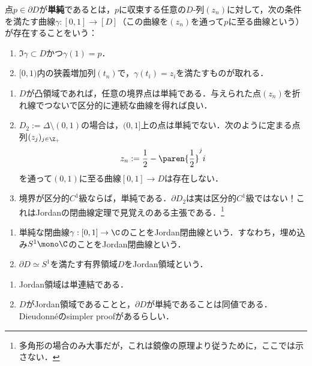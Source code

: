 \documentclass[uplatex, dvipdfmx]{jsreport}
\begin{document}
\begin{definition}
    点$p\in\partial D$が\textbf{単純}であるとは，$p$に収束する任意の$D$-列$(z_n)$に対して，次の条件を満たす曲線$\gamma:[0,1]\to[D]$（この曲線を$(z_n)$を通って$p$に至る曲線という）が存在することをいう：
    \begin{enumerate}
        \item $\Im\gamma\subset D$かつ$\gamma(1)=p$．
        \item $[0,1)$内の狭義増加列$(t_n)$で，$\gamma(t_i)=z_i$を満たすものが取れる．
    \end{enumerate}
\end{definition}
\begin{example}\mbox{}
    \begin{enumerate}
        \item $D$が凸領域であれば，任意の境界点は単純である．与えられた点$(z_n)$を折れ線でつないで区分的に連続な曲線を得れば良い．
        \item $D_2:=\Delta\setminus(0,1)$の場合は，$(0,1]$上の点は単純でない．次のように定まる点列$(z_j)_{j\in\Z_+}$
        \[z_n:=\frac{1}{2}-\paren{\frac{1}{2}}^ji\]
        を通って$(0,1)$に至る曲線$[0,1]\to D$は存在しない．
        \item 境界が区分的$C^1$級ならば，単純である．$\partial D_2$は実は区分的$C^1$級ではない！これはJordanの閉曲線定理で見覚えのある主張である．\footnote{多角形の場合のみ大事だが，これは鏡像の原理より従うために，ここでは示さない．}
    \end{enumerate}
\end{example}

\begin{definition}\mbox{}
    \begin{enumerate}
        \item 単純な閉曲線$\gamma:[0,1]\to\C$のことをJordan閉曲線という．すなわち，埋め込み$S^1\mono\C$のことをJordan閉曲線という．
        \item $\partial D\simeq S^1$を満たす有界領域$D$をJordan領域という．
    \end{enumerate}
\end{definition}
\begin{remark}\mbox{}
    \begin{enumerate}
        \item Jordan領域は単連結である．
        \item $D$がJordan領域であることと，$\partial D$が単純であることは同値である．Dieudonnéのsimpler proofがあるらしい．
    \end{enumerate}
\end{remark}
\end{document}
